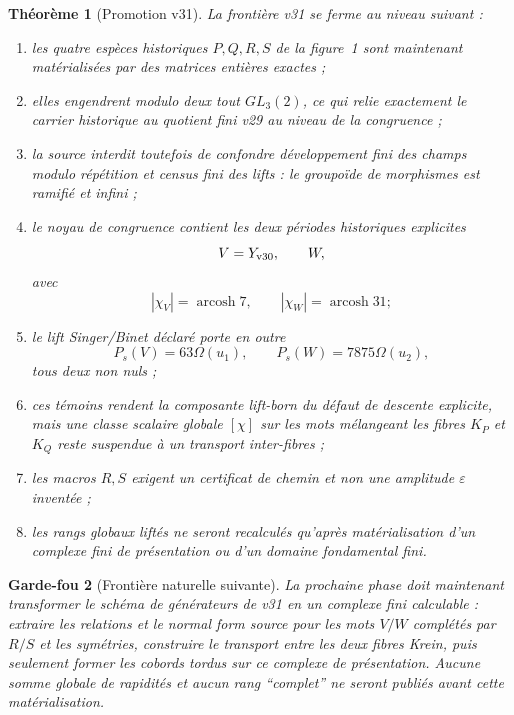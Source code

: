 \documentclass[11pt,a4paper]{article}
\newtheorem{theorem}{Théorème}[section]
\newtheorem{guardrail}[theorem]{Garde-fou}
\begin{document}
\begin{theorem}[Promotion v31]\label{thm:v31-verdict}
La frontière v31 se ferme au niveau suivant :
\begin{enumerate}[label=\textup{(\roman*)}]
\item les quatre espèces historiques $P,Q,R,S$ de la figure~1 sont maintenant matérialisées par
des matrices entières exactes ;
\item elles engendrent modulo deux tout $GL_3(2)$, ce qui relie exactement le carrier historique
au quotient fini v29 au niveau de la congruence ;
\item la source interdit toutefois de confondre développement fini des champs modulo répétition
et census fini des lifts : le groupoïde de morphismes est ramifié et infini ;
\item le noyau de congruence contient les deux périodes historiques explicites
\[
 V=Y_{\rm v30},\qquad W,
\]
avec
\[
 |\chi_V|=\operatorname{arcosh}7,
 \qquad
 |\chi_W|=\operatorname{arcosh}31;
\]
\item le lift Singer/Binet déclaré porte en outre
\[
 P_s(V)=63\Omega(u_1),
 \qquad
 P_s(W)=7875\Omega(u_2),
\]
tous deux non nuls ;
\item ces témoins rendent la composante lift-born du défaut de descente explicite, mais une classe
scalaire globale $[\chi]$ sur les mots mélangeant les fibres $K_P$ et $K_Q$ reste suspendue à un
transport inter-fibres ;
\item les macros $R,S$ exigent un certificat de chemin et non une amplitude $\varepsilon$ inventée ;
\item les rangs globaux liftés ne seront recalculés qu'après matérialisation d'un complexe fini de
présentation ou d'un domaine fondamental fini.
\end{enumerate}
\end{theorem}

\begin{guardrail}[Frontière naturelle suivante]
La prochaine phase doit maintenant transformer le schéma de générateurs de v31 en un complexe
fini calculable : extraire les relations et le normal form source pour les mots $V/W$ complétés par
$R/S$ et les symétries, construire le transport entre les deux fibres Krein, puis seulement former
les cobords tordus sur ce complexe de présentation. Aucune somme globale de rapidités et aucun
rang ``complet'' ne seront publiés avant cette matérialisation.
\end{guardrail}
\end{document}
